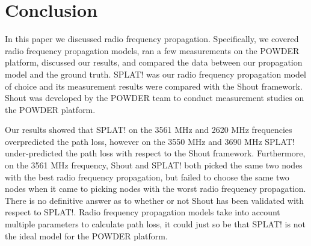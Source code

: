 

\section{Conclusion}
\label{sec:conclusion}

In this paper we discussed radio frequency propagation. Specifically, we covered radio frequency propagation models, ran a few 
measurements on the POWDER platform, discussed our results, and compared the data between our propagation model and the 
ground truth. SPLAT! was our radio frequency propagation model of choice and its measurement results were compared with the 
Shout framework. Shout was developed by the POWDER team to conduct measurement studies on the POWDER platform. 

Our results showed that
SPLAT! on the 3561 MHz and 2620 MHz frequencies overpredicted the path loss, however on the 3550 MHz and 3690 MHz SPLAT!
under-predicted the path loss with respect to the Shout framework. Furthermore, on the 3561 MHz frequency, Shout and SPLAT! 
both picked the same two nodes with the best radio frequency propagation, but failed to choose the same two nodes when it came
to picking nodes with the worst radio frequency propagation. There is no definitive answer as to whether or not Shout has been
validated with respect to SPLAT!. Radio frequency propagation models take into account multiple parameters to calculate path loss,
it could just so be that SPLAT! is not the ideal model for the POWDER platform.

